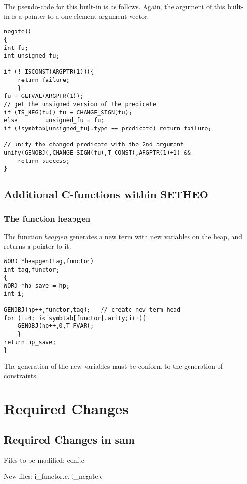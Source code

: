 The pseudo-code for this built-in is as follows. Again, the argument
of this built-in is a pointer to a one-element argument vector.

\begin{verbatim}
negate()
{
int fu;
int unsigned_fu;

if (! ISCONST(ARGPTR(1))){
	return failure;
	}
fu = GETVAL(ARGPTR(1));
// get the unsigned version of the predicate
if (IS_NEG(fu)) fu = CHANGE_SIGN(fu);
else 		unsigned_fu = fu;
if (!symbtab[unsigned_fu].type == predicate) return failure;

// unify the changed predicate with the 2nd argument
unify(GENOBJ(,CHANGE_SIGN(fu),T_CONST),ARGPTR(1)+1) && 
	return success;
}
\end{verbatim}

\subsection{Additional C-functions within SETHEO}
\subsubsection{The function heapgen}

The function {\em heapgen\/} generates a new term with new variables
on the heap, and returns a pointer to it.

\begin{verbatim}
WORD *heapgen(tag,functor)
int tag,functor;
{
WORD *hp_save = hp;
int i;

GENOBJ(hp++,functor,tag);   // create new term-head
for (i=0; i< symbtab[functor].arity;i++){
	GENOBJ(hp++,0,T_FVAR);
	}
return hp_save;
}
\end{verbatim}

The generation of the new variables must be conform to the generation
of constraints.

        


\section{Required Changes}

\subsection{Required Changes in sam}

Files to be modified: conf.c

New files: i\_functor.c, i\_negate.c

